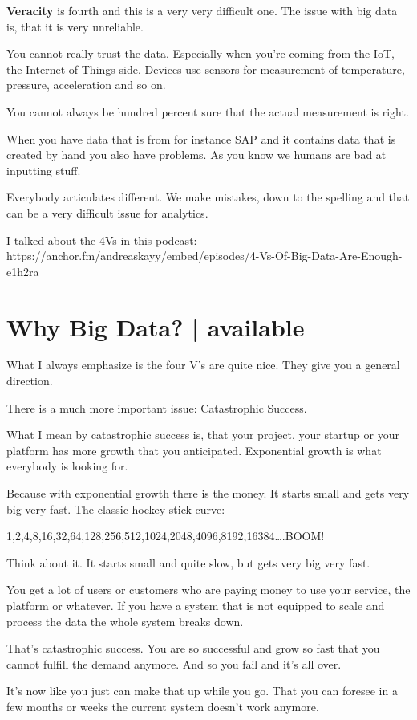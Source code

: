 \documentclass[12pt, numbers=noenddot]{scrreprt} %
\begin{document}
\textbf{Veracity} is fourth and this is a very very difficult one. The issue with big data is, that it is very unreliable.

You cannot really trust the data. Especially when you’re coming from the IoT, the Internet of Things side. Devices use sensors for measurement of temperature, pressure, acceleration and so on.

You cannot always be hundred percent sure that the actual measurement is right.

When you have data that is from for instance SAP and it contains data that is created by hand you also have problems. As you know we humans are bad at inputting stuff.

Everybody articulates different. We make mistakes, down to the spelling and that can be a very difficult issue for analytics.


I talked about the 4Vs in this podcast: https://anchor.fm/andreaskayy/embed/episodes/4-Vs-Of-Big-Data-Are-Enough-e1h2ra

\section{Why Big Data? | available}

What I always emphasize is the four V’s are quite nice. They give you a general direction.

There is a much more important issue: Catastrophic Success.

What I mean by catastrophic success is, that your project, your startup or your platform has more growth that you anticipated. Exponential growth is what everybody is looking for.

Because with exponential growth there is the money. It starts small and gets very big very fast. The classic hockey stick curve:

1,2,4,8,16,32,64,128,256,512,1024,2048,4096,8192,16384….BOOM!

Think about it. It starts small and quite slow, but gets very big very fast.

You get a lot of users or customers who are paying money to use your service, the platform or whatever. If you have a system that is not equipped to scale and process the data the whole system breaks down.

That’s catastrophic success. You are so successful and grow so fast that you cannot fulfill the demand anymore. And so you fail and it’s all over.

It’s now like you just can make that up while you go. That you can foresee in a few months or weeks the current system doesn’t work anymore.
\end{document}

